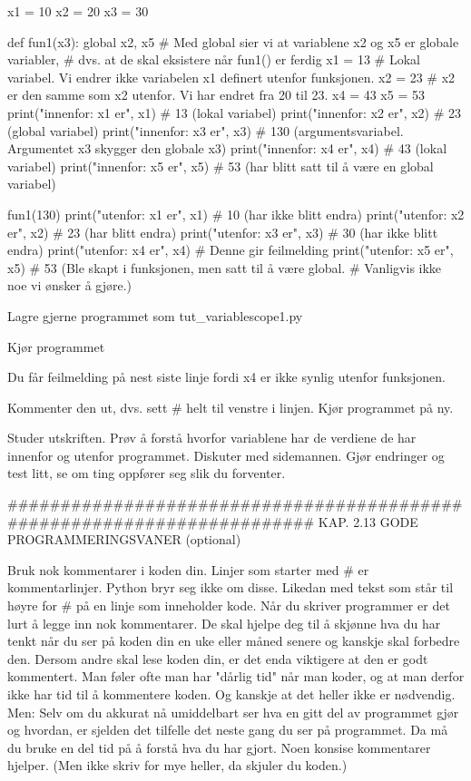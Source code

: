 \documentclass[a4paper,11pt,utf8]{book}
\begin{document}
x1 = 10
x2 = 20
x3 = 30

def fun1(x3):
    global x2, x5   # Med global sier vi at variablene x2 og x5 er globale variabler,  
                    # dvs. at de skal eksistere når fun1() er ferdig
    x1 = 13   # Lokal variabel. Vi endrer ikke variabelen x1 definert utenfor funksjonen. 
    x2 = 23   # x2 er den samme som x2 utenfor. Vi har endret fra 20 til 23. 
    x4 = 43
    x5 = 53
    print("innenfor: x1 er", x1)  #  13 (lokal variabel)
    print("innenfor: x2 er", x2)  #  23 (global variabel)
    print("innenfor: x3 er", x3)  # 130 (argumentsvariabel. Argumentet x3 skygger den globale x3)
    print("innenfor: x4 er", x4)  #  43 (lokal variabel)
    print("innenfor: x5 er", x5)  #  53 (har blitt satt til å være en global variabel)

fun1(130)
print("utenfor: x1 er", x1)   # 10 (har ikke blitt endra)
print("utenfor: x2 er", x2)   # 23 (har blitt endra)
print("utenfor: x3 er", x3)   # 30 (har ikke blitt endra)
print("utenfor: x4 er", x4)   # Denne gir feilmelding 
print("utenfor: x5 er", x5)   # 53 (Ble skapt i funksjonen, men satt til å være global. 
                              # Vanligvis ikke noe vi ønsker å gjøre.) 

Lagre gjerne programmet som tut_variablescope1.py

Kjør programmet

Du får feilmelding på nest siste linje fordi x4 er ikke synlig utenfor funksjonen. 

Kommenter den ut, dvs. sett # helt til venstre i linjen. 
Kjør programmet på ny.

Studer utskriften.
Prøv å forstå hvorfor variablene har de verdiene de har innenfor og utenfor programmet.
Diskuter med sidemannen. 
Gjør endringer og test litt, se om ting oppfører seg slik du forventer. 





######################################################################## 
KAP. 2.13  GODE PROGRAMMERINGSVANER  (optional)

Bruk nok kommentarer i koden din. 
Linjer som starter med # er kommentarlinjer. 
Python bryr seg ikke om disse. 
Likedan med tekst som står til høyre for # på en linje som inneholder kode.
Når du skriver programmer er det lurt å legge inn nok kommentarer.
De skal hjelpe deg til å skjønne hva du har tenkt når du ser på koden din
en uke eller måned senere og kanskje skal forbedre den.
Dersom andre skal lese koden din, er det enda viktigere at den er godt kommentert.
Man føler ofte man har "dårlig tid" når man koder,
og at man derfor ikke har tid til å kommentere koden.
Og kanskje at det heller ikke er nødvendig. 
Men: Selv om du akkurat nå umiddelbart ser hva en gitt del av programmet gjør og hvordan,
er sjelden det tilfelle det neste gang du ser på programmet.
Da må du bruke en del tid på å forstå hva du har gjort.
Noen konsise kommentarer hjelper.
(Men ikke skriv for mye heller, da skjuler du koden.) 
\end{document}
